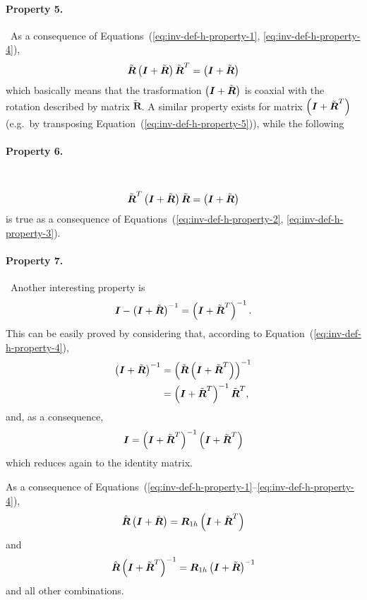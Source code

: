 \documentclass[10pt,dvips,fleqn,subeqn]{report}
\newcommand{\T}[1]{\boldsymbol{#1}}
\begin{document}
\paragraph{Property 5.} \
As a consequence
of Equations~(\ref{eq:inv-def-h-property-1}, \ref{eq:inv-def-h-property-4}),
\begin{equation}
	\tilde{\T{R}} \plbr{\T{I} + \tilde{\T{R}}} \tilde{\T{R}}^T = \plbr{\T{I} + \tilde{\T{R}}}
	\label{eq:inv-def-h-property-5}
\end{equation}
which basically means that the trasformation $\plbr{\T{I} + \tilde{\T{R}}}$
is coaxial with the rotation described by matrix $\tilde{\T{R}}$.
A similar property exists for matrix $\plbr{\T{I} + \tilde{\T{R}}^T}$
(e.g.\ by transposing Equation~(\ref{eq:inv-def-h-property-5})),
while the following

\paragraph{Property 6.} \
\begin{equation}
	\tilde{\T{R}}^T \plbr{\T{I} + \tilde{\T{R}}} \tilde{\T{R}} = \plbr{\T{I} + \tilde{\T{R}}}
	\label{eq:inv-def-h-property-6}
\end{equation}
is true as a consequence
of Equations~(\ref{eq:inv-def-h-property-2}, \ref{eq:inv-def-h-property-3}).

\paragraph{Property 7.} \
Another interesting property is
\begin{equation}
	\T{I} - \plbr{\T{I} + \tilde{\T{R}}}^{-1} = \plbr{\T{I} + \tilde{\T{R}}^T}^{-1} .
	\label{eq:inv-def-h-property-7}
\end{equation}
This can be easily proved by considering that,
according to Equation~(\ref{eq:inv-def-h-property-4}),
\begin{align}
	\plbr{\T{I} + \tilde{\T{R}}}^{-1}
	&= \plbr{\tilde{\T{R}}\plbr{\T{I} + \tilde{\T{R}}^T}}^{-1} \\
	&= \plbr{\T{I} + \tilde{\T{R}}^T}^{-1} \tilde{\T{R}}^T ,
\end{align}
and, as a consequence,
\begin{equation}
	\T{I} = \plbr{\T{I} + \tilde{\T{R}}^T}^{-1} \plbr{\T{I} + \tilde{\T{R}}^T}
\end{equation}
which reduces again to the identity matrix.

As a consequence
of Equations~(\ref{eq:inv-def-h-property-1}--\ref{eq:inv-def-h-property-4}),
\begin{equation}
	\hat{\T{R}} \plbr{\T{I} + \tilde{\T{R}}} 
	= \T{R}_{1h} \plbr{\T{I} + \tilde{\T{R}}^T}
\end{equation}
and
\begin{equation}
	\hat{\T{R}} \plbr{\T{I} + \tilde{\T{R}}^T}^{-1}
	= \T{R}_{1h} \plbr{\T{I} + \tilde{\T{R}}}^{-1}
\end{equation}
and all other combinations.
\end{document}
